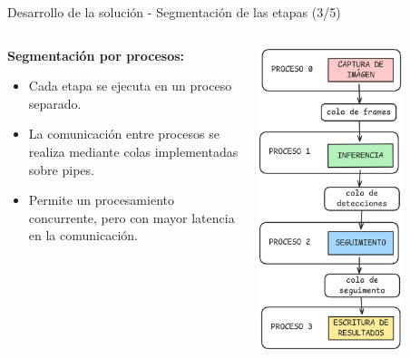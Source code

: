 \documentclass[spanish]{beamer}
\begin{document}
\begin{frame}{Desarrollo de la solución - Segmentación de las etapas (3/5)}
    \begin{columns}
        \begin{column}{0.5\textwidth}
            \textbf{Segmentación por procesos:}
            \begin{itemize}
                \item Cada etapa se ejecuta en un proceso separado.
                \item La comunicación entre procesos se realiza mediante colas implementadas sobre pipes.
                \item Permite un procesamiento concurrente, pero con mayor latencia en la comunicación.
        \end{itemize}
        \end{column}
            \begin{column}{0.5\textwidth}
            \begin{center}
                \includegraphics[width=0.7\textwidth]{images/solucion_propuesta/segmentacion_procesos.png}
            \end{center}
        \end{column}
    \end{columns}

\end{frame}
\end{document}
